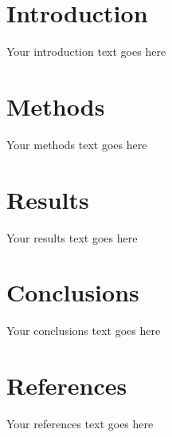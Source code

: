 \documentclass[a2,portrait]{a0poster}
\begin{document}
\begin{multicols}{2}
\color{Black} 
\section*{Introduction}
Your introduction text goes here


\color{SaddleBrown} 
\section*{Methods}

Your methods text goes here


\color{Black} 
\section*{Results}

Your results text goes here


\color{DarkSlateGray} 
\section*{Conclusions}

Your conclusions text goes here


\color{Black} 
\section*{References}

Your references text goes here


\end{multicols}
\end{document}
